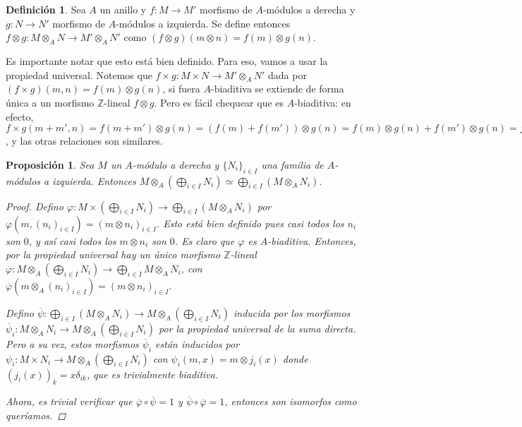 \documentclass[12pt]{book}
\newtheorem{prop}[teo]{Proposición}
\theoremstyle{definition}
\newtheorem{defn}[teo]{Definición}
\newcommand{\ZZ}{\mathbb{Z}}      %
\begin{document}
\begin{defn}
Sea $A$ un anillo y $f:M\to M'$ morfismo de $A$-módulos a derecha y $g:N\to N'$ morfismo de $A$-módulos a izquierda. Se define entonces $f\otimes g:M\otimes_A N\to M'\otimes_A N'$ como $(f\otimes g)(m\otimes n) = f(m)\otimes g(n)$.

Es importante notar que esto está bien definido. Para eso, vamos a usar la propiedad universal. Notemos que $f\times g:M\times N\to M'\otimes_A N'$ dada por $(f\times g)(m,n) = f(m)\otimes g(n)$, si fuera $A$-biaditiva se extiende de forma única a un morfismo $\ZZ$-lineal $f\otimes g$. Pero es fácil chequear que es $A$-biaditiva: en efecto, $f\times g(m+m',n) = f(m+m')\otimes g(n) = (f(m)+f(m'))\otimes g(n) = f(m)\otimes g(n) + f(m')\otimes g(n) = f\times g(m,n) + f\times g (m',n)$, y las otras relaciones son similares.
\end{defn}

\begin{prop}
Sea $M$ un $A$-módulo a derecha y $\{N_i\}_{i\in I}$ una familia de $A$-módulos a izquierda. Entonces $M\otimes_A\left(\displaystyle\bigoplus_{i\in I} N_i\right) \simeq \displaystyle\bigoplus_{i\in I}(M\otimes_A N_i)$.
\begin{proof}
Defino $\varphi:M\times \left(\displaystyle\bigoplus_{i\in I}N_i\right)\to \displaystyle\bigoplus_{i\in I}(M\otimes_A N_i)$ por $\varphi(m,(n_i)_{i\in I}) = (m\otimes n_i)_{i\in I}$. Esto está bien definido pues casi todos los $n_i$ son $0$, y así casi todos los $m\otimes n_i$ son $0$. Es claro que $\varphi$ es $A$-biaditiva. Entonces, por la propiedad universal hay un único morfismo $\ZZ$-lineal $\overline{\varphi}:M\otimes_A\left(\displaystyle\bigoplus_{i\in I}N_i\right) \to \displaystyle\bigoplus_{i\in I}M\otimes_A N_i$, con $\overline{\varphi}(m\otimes_A (n_i)_{i\in I})=(m\otimes n_i)_{i\in I}$.

Defino $\overline{\psi}:\displaystyle\bigoplus_{i\in I}(M\otimes_A N_i)\to M\otimes_A \left(\displaystyle\bigoplus_{i\in I}N_i\right)$ inducida por los morfismos $\overline{\psi}_i:M\otimes_A N_i\to M\otimes_A \left(\displaystyle\bigoplus_{i\in I} N_i\right)$ por la propiedad universal de la suma directa. Pero a su vez, estos morfismos $\overline{\psi}_i$ están inducidos por $\psi_i:M\times N_i\to M\otimes_A \left(\bigoplus_{i\in I}N_i\right)$ con $\psi_i(m,x) = m\otimes j_i(x)$ donde $(j_i(x))_k=x\delta_{ik}$, que es trivialmente biaditiva.

Ahora, es trivial verificar que $\overline{\varphi}\circ\overline{\psi}=1$ y $\overline{\psi}\circ\overline{\varphi}=1$, entonces son isomorfos como queríamos.
\end{proof}
\end{prop}
\end{document}
